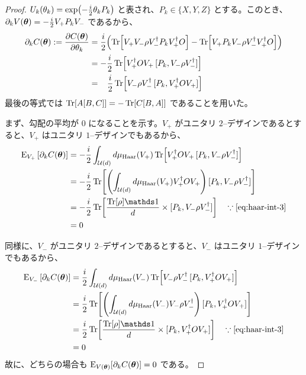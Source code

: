 \begin{proof}\label{proof:bp}
    $U_k(\theta_k) = \exp(-\frac{i}{2}\theta_k P_k)$ と表され、$P_k \in \{X,Y,Z\}$ とする。このとき、$\partial_k V(\boldsymbol{\theta}) = -\frac{i}{2}V_+P_kV_-$ であるから、
    \begin{align}
        \partial_k C(\boldsymbol{\theta}) := \frac{\partial C(\boldsymbol{\theta})}{\partial \theta_k}
        &= \frac{i}{2}\qty(\Tr[V_+V_-\rho V_-^\dagger P_kV_+^\dagger O] - \Tr[V_+P_kV_-\rho V_-^\dagger V_+^\dagger O])\\
        &= -\frac{i}{2}\Tr[ V_+^\dagger OV_+\, [P_k, V_-\rho V_-^\dagger]]\\
        &=\;\;\;\frac{i}{2}\Tr[V_-\rho V_-^\dagger\, [P_k, V_+^\dagger OV_+]]
    \end{align}
    最後の等式では $\Tr[A[B,C]] = -\Tr[C[B,A]]$ であることを用いた。
    
    まず、勾配の平均が $0$ になることを示す。$V_+$ がユニタリ $2$--デザインであるとすると、$V_+$ はユニタリ $1$--デザインでもあるから、
    \begin{align}
        \E_{V_+}\qty[\pd_k C(\bs{\th})]
        &= -\frac{i}{2}\int_{\calU(d)} d\mu_{\Haar}(V_+) \Tr[ V_+\dg OV_+\, [P_k, V_-\rho V_-\dg]]\\
        &= -\frac{i}{2}\Tr[\qty(\int_{\calU(d)} d\mu_{\Haar}(V_+) V_+\dg OV_+)\, [P_k, V_-\rho V_-\dg]]\\
        &= -\frac{i}{2}\Tr[\frac{\Tr[\rho]\bbid}{d} \times [P_k, V_-\rho V_-\dg]]\quad \because \eqref{eq:haar-int-3}\\
        &= 0 
    \end{align}
    
    同様に、$V_-$ がユニタリ $2$--デザインであるとすると、$V_-$ はユニタリ $1$--デザインでもあるから、
    \begin{align}
        \E_{V_-}\qty[\pd_k C(\bs{\th})]
        &= \frac{i}{2}\int_{\calU(d)} d\mu_{\Haar}(V_-) \Tr[V_-\rho V_-\dg\, [P_k, V_+\dg OV_+]]\\
        &= \frac{i}{2}\Tr[\qty(\int_{\calU(d)} d\mu_{\Haar}(V_-) V_-\rho V_-\dg)\, [P_k, V_+\dg OV_+]]\\
        &= \frac{i}{2}\Tr[\frac{\Tr[\rho]\bbid}{d} \times [P_k, V_+\dg OV_+]]\quad \because \eqref{eq:haar-int-3}\\
        &= 0
    \end{align}
    故に、どちらの場合も $\operatorname{E}_{V(\boldsymbol{\theta})}[\partial_k C(\boldsymbol{\theta})] = 0$ である。
    

\end{proof}

